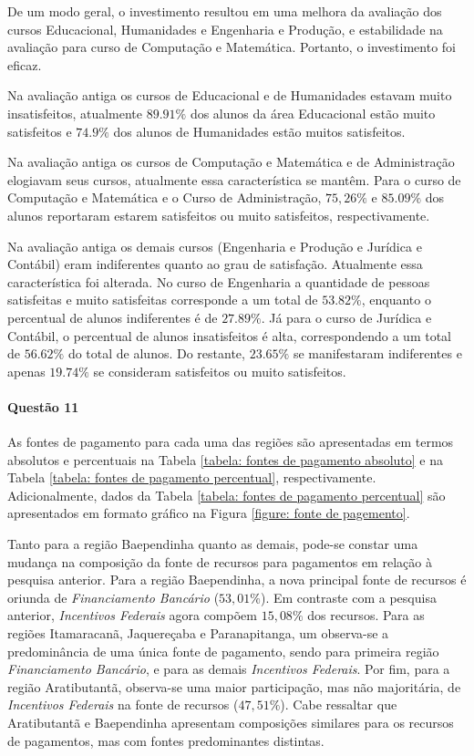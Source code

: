 \documentclass[10pt,a4paper,oneside]{article}
\newcommand{\arat}{Aratibutantã\xspace}
\newcommand{\baep}{Baependinha\xspace}
\newcommand{\itam}{Itamaracanã\xspace}
\newcommand{\jaqu}{Jaquereçaba\xspace}
\newcommand{\para}{Paranapitanga\xspace}
\newcommand{\comp}{Computação e Matemática\xspace}
\newcommand{\edu}{Educacional\xspace}
\newcommand{\eng}{Engenharia e Produção\xspace}
\newcommand{\hum}{Humanidades\xspace}
\begin{document}
De um modo geral, o investimento resultou em uma melhora da avaliação dos cursos \edu, \hum e \eng, e estabilidade na avaliação para curso de \comp. Portanto, o investimento foi eficaz.

Na avaliação antiga  os cursos de Educacional e de Humanidades estavam muito insatisfeitos, atualmente $89.91\%$ dos alunos da área Educacional estão muito satisfeitos e $74.9\%$ dos alunos de Humanidades estão muitos satisfeitos.

Na avaliação antiga os cursos de Computação e Matemática e de Administração elogiavam seus cursos, atualmente essa característica se mantêm. Para o curso de Computação e Matemática e o Curso de Administração, $75,26\%$ e $85.09\%$ dos alunos reportaram estarem satisfeitos ou muito satisfeitos, respectivamente.

Na avaliação antiga os demais cursos (Engenharia e Produção e Jurídica e Contábil) eram indiferentes quanto ao grau de satisfação. Atualmente essa característica foi alterada. No curso de Engenharia a quantidade de pessoas satisfeitas e muito satisfeitas corresponde a um total de $53.82\%$, enquanto o percentual de alunos indiferentes é de $27.89\%$. Já para o curso de Jurídica e Contábil, o percentual de alunos insatisfeitos é alta, correspondendo a um total de $56.62\%$ do total de alunos. Do restante, $23.65\%$ se manifestaram indiferentes e apenas $19.74\%$ se consideram satisfeitos ou muito satisfeitos.

\paragraph{Questão 11}

As fontes de pagamento para cada uma das regiões são apresentadas em termos absolutos e percentuais na Tabela \ref{tabela: fontes de pagamento absoluto} e na Tabela \ref{tabela: fontes de pagamento percentual}, respectivamente. Adicionalmente, dados da Tabela \ref{tabela: fontes de pagamento percentual} são apresentados em formato gráfico na Figura \ref{figure: fonte de pagemento}.

Tanto para a região \baep quanto as demais, pode-se constar uma mudança na composição da fonte de recursos para pagamentos em relação à pesquisa anterior. Para a região \baep, a nova principal fonte de recursos é oriunda de \textit{Financiamento Bancário} ($53,01\%$). Em contraste com a pesquisa anterior, \textit{Incentivos Federais} agora compõem $15,08\%$ dos recursos. Para as regiões \itam, \jaqu e \para, um observa-se a predominância de uma única fonte de pagamento, sendo para primeira região \textit{Financiamento Bancário}, e para as demais \textit{Incentivos Federais}. Por fim, para a região \arat, observa-se uma maior participação, mas não majoritária, de \textit{Incentivos Federais} na fonte de recursos ($47,51\%$). Cabe ressaltar que \arat e \baep apresentam composições similares para os recursos de pagamentos, mas com fontes predominantes distintas.
\end{document}
